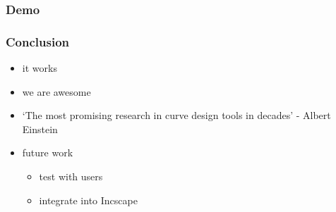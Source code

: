 \documentclass[mathserif]{beamer}
\begin{document}
		
		\begin{frame}
			\frametitle{Demo}
		\end{frame}
		
		\begin{frame}
			\frametitle{Conclusion}
			\begin{itemize}
				\item it works
				\item we are awesome
				\item `The most promising research in curve design tools in decades' - Albert Einstein
				\item future work
				\begin{itemize}
					\item test with users
					\item integrate into Incscape
				\end{itemize}
			\end{itemize}
		\end{frame}
\end{document}
